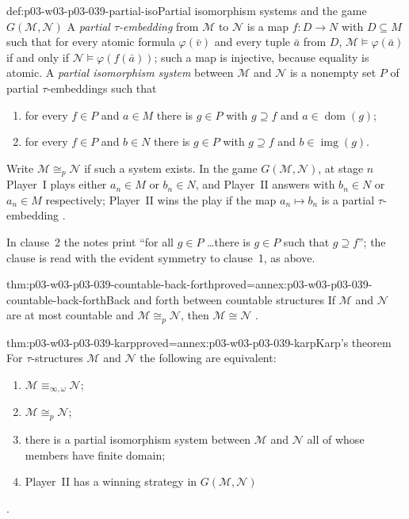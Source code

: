 \begin{hbdefinition}{def:p03-w03-p03-039-partial-iso}{Partial isomorphism systems and the game \(G(\mathcal M,\mathcal N)\)}
A \emph{partial \(\tau\)-embedding} from \(\mathcal M\) to \(\mathcal N\) is a
map \(f:D\to N\) with \(D\subseteq M\) such that for every atomic formula
\(\varphi(\bar v)\) and every tuple \(\bar a\) from \(D\),
\(\mathcal M\models\varphi(\bar a)\) if and only if
\(\mathcal N\models\varphi(f(\bar a))\); such a map is injective, because
equality is atomic. A \emph{partial isomorphism system} between
\(\mathcal M\) and \(\mathcal N\) is a nonempty set \(P\) of partial
\(\tau\)-embeddings such that
\begin{enumerate}
\item for every \(f\in P\) and \(a\in M\) there is \(g\in P\) with
      \(g\supseteq f\) and \(a\in\operatorname{dom}(g)\);
\item for every \(f\in P\) and \(b\in N\) there is \(g\in P\) with
      \(g\supseteq f\) and \(b\in\operatorname{img}(g)\).
\end{enumerate}
Write \(\mathcal M\cong_p\mathcal N\) if such a system exists. In the game
\(G(\mathcal M,\mathcal N)\), at stage \(n\) Player~I plays either
\(a_n\in M\) or \(b_n\in N\), and Player~II answers with \(b_n\in N\) or
\(a_n\in M\) respectively; Player~II wins the play if the map
\(a_n\mapsto b_n\) is a partial \(\tau\)-embedding
\cite[Defs.~2.1 and~2.3, p.~13]{Marker2014InfinitaryNotes}.
\end{hbdefinition}

In clause~2 the notes print ``for all \(g\in P\) \ldots there is \(g\in P\)
such that \(g\supseteq f\)''; the clause is read with the evident symmetry to
clause~1, as above.

\begin{hblemma}{thm:p03-w03-p03-039-countable-back-forth}{proved=annex:p03-w03-p03-039-countable-back-forth}{Back and forth between countable structures}
If \(\mathcal M\) and \(\mathcal N\) are at most countable and
\(\mathcal M\cong_p\mathcal N\), then \(\mathcal M\cong\mathcal N\)
\cite[Ex.~2.2, p.~13]{Marker2014InfinitaryNotes}.
\end{hblemma}

\begin{hbtheorem}{thm:p03-w03-p03-039-karp}{proved=annex:p03-w03-p03-039-karp}{Karp's theorem}
For \(\tau\)-structures \(\mathcal M\) and \(\mathcal N\) the following are
equivalent:
\begin{enumerate}
\item \(\mathcal M\equiv_{\infty,\omega}\mathcal N\);
\item \(\mathcal M\cong_p\mathcal N\);
\item there is a partial isomorphism system between \(\mathcal M\) and
      \(\mathcal N\) all of whose members have finite domain;
\item Player~II has a winning strategy in \(G(\mathcal M,\mathcal N)\)
\end{enumerate}
\cite[Thm.~2.4, pp.~13--14]{Marker2014InfinitaryNotes}.
\end{hbtheorem}

